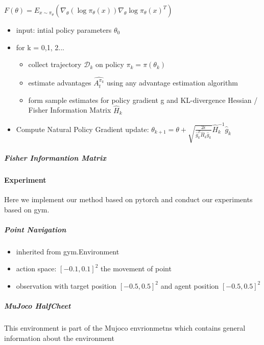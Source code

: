 \documentclass{article}
\begin{document}
$F(\theta)=E_{x\sim \pi_{\theta}}(\nabla_\theta(\log{\pi_\theta(x)})\nabla_{\theta}\log{\pi_{\theta}(x)^T})$
\begin{itemize}
\item input: intial policy parameters $\theta_0$
\item for k = 0,1, 2...
    \begin{itemize}
        \item  collect trajectory $\mathcal{D}_k$ on policy $\pi_k=\pi(\theta_k)$
        \item estimate advantages $\hat{A_t^{\pi_k}}$ using any advantage estimation algorithm
        \item form sample estimates for policy gradient g and KL-divergence Hessian / Fisher Information Matrix $\hat{H}_k$
    \end{itemize}
\item Compute Natural Policy Gradient update: $\theta_{k+1}=\theta + \sqrt{\frac{2\epsilon}{\hat{g}_k^T\hat{H}_k\hat{g}_k}}\hat{H}_k^{-1}\hat{g}_k$
\end{itemize}

\subparagraph{Fisher Informantion Matrix}



\paragraph{Experiment}

Here we implement our method based on pytorch and conduct our experiments based on gym.

\subparagraph{Point Navigation}

\begin{itemize}
\item inherited from gym.Environment
\item action space: $[-0.1, 0.1]^2$ the movement of point
\item observation with target position $[-0.5,0.5]^2$ and agent position $[-0.5,0.5]^2$
\end{itemize}

\subparagraph{MuJoco HalfCheet}

This environment is part of the Mujoco envrionmetns which contains general information about the environment
\end{document}
